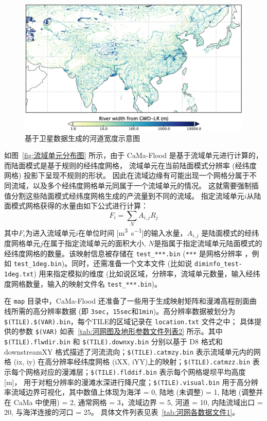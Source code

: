 {
\begin{figure}[htbp]
\centering
\includegraphics[width=1.0\textwidth]{Figures/陆地表面的水分循环/基于卫星数据生成的河道宽度示意图.png}
\caption{基于卫星数据生成的河道宽度示意图}
\label{fig:基于卫星数据生成的河道宽度示意图}
\end{figure}
}

如图~\ref{fig:流域单元分布图} 所示，由于 CaMa-Flood 是基于流域单元进行计算的，而陆面模式是基于规则的经纬度网格，
流域单元在当前陆面模式分辨率 (经纬度网格) 投影下呈现不规则的形状。
因此在流域边缘有可能出现一个网格分属于不同流域，以及多个经纬度网格单元同属于一个流域单元的情况。
这就需要强制插值分割这些陆面模式经纬度网格生成的产流量到不同的流域。
指定流域单元$i$从陆面模式网格获得的水量由如下公式进行计算：
\begin{equation}
F_{i}=\sum_{N} A_{i, j} R_{j}
\end{equation}
其中$F_i$为进入流域单元$i$在单位时间 [\unit{m^3.s^{-1}}]的输入水量，$A_{i, j}$ 是陆面模式的经纬度网格单元$j$在属于指定流域单元的面积大小,
 $N$是指属于指定流域单元陆面模式的经纬度网格的数量。该映射信息被存储在 \texttt{test\_***.bin} (\texttt{***} 是网格分辨率
 ，例如 \texttt{test\_1deg.bin})。同时，还需准备一个文本文件 (比如说 \texttt{diminfo\_test-1deg.txt}) 用来指定模拟的维度
  (比如说区域，分辨率，流域单元数量，输入经纬度网格数量，输入的映射文件名 \texttt{test\_***.bin})。

在 \texttt{map} 目录中，CaMa-Flood 还准备了一些用于生成映射矩阵和漫滩高程剖面曲线所需的高分辨率数据 (即 \texttt{3sec}，\texttt{15sec}和\texttt{1min})。高分辨率数据被划分为\texttt{\$(TILE).\$(VAR).bin}，每个TILE的区域记录在 \texttt{location.txt} 文件之中；
具体提供的参数 \texttt{\$(VAR)} 如表~\ref{tab:河网图及地形参数文件列表2} 所示。其中 \texttt{\$(TILE).flwdir.bin} 和
\texttt{\$(TILE).downxy.bin} 分别以基于 D8 格式和 downstreamXY 格式描述了河流流向；\texttt{\$(TILE).catmzy.bin} 表示流域单元内的网格 (ix, iy) 
在高分辨率经纬度网格 (iXX, iYY)上的映射；\texttt{\$(TILE).catmzz.bin} 表示每个网格对应的漫滩层；\texttt{\$(TILE).flddif.bin} 表示每个网格堤坝平均高度 [m]，
用于对粗分辨率的漫滩水深进行降尺度；\texttt{\$(TILE).visual.bin} 用于高分辨率流域边界可视化，其中数值上体现为海洋 = 0, 
陆地 (未调整) = 1, 陆地 (调整并在 CaMa 中使用) = 2, 通常网格 = 3，流域边界 = 5, 河道 = 10, 内陆流域出口 = 20, 与海洋连接的河口 = 25。
具体文件列表见表~\ref{tab:河网各数据文件1}。

